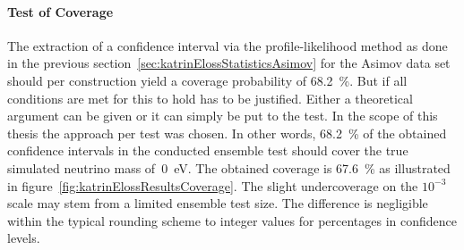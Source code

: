 \paragraph{Test of Coverage}
The extraction of a confidence interval via the profile-likelihood method as done in the previous section~\ref{sec:katrinElossStatisticsAsimov} for the Asimov data set should per construction yield a coverage probability of \SI{68.2}{\percent}. But if all conditions are met for this to hold has to be justified. Either a theoretical argument can be given or it can simply be put to the test. In the scope of this thesis the approach per test was chosen. In other words, \SI{68.2}{\percent} of the obtained confidence intervals in the conducted ensemble test should cover the true simulated neutrino mass of~\SI{0}{eV}. The obtained coverage is \SI{67.6}{\percent} as illustrated in figure~\ref{fig:katrinElossResultsCoverage}. The slight undercoverage on the $10^{-3}$ scale may stem from a limited ensemble test size. The difference is negligible within the typical rounding scheme to integer values for percentages in confidence levels.

